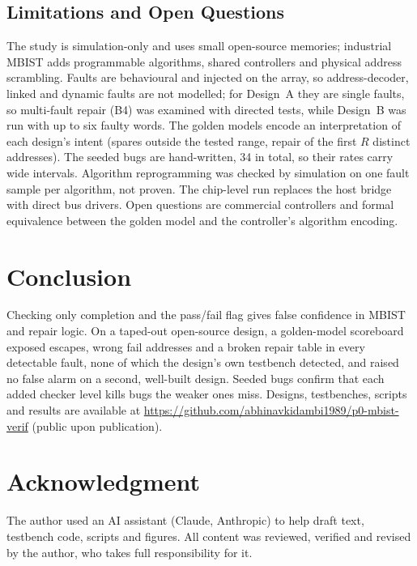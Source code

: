 \documentclass[conference]{IEEEtran}
\begin{document}
\subsection{Limitations and Open Questions}
The study is simulation-only and uses small open-source memories; industrial MBIST adds
programmable algorithms, shared controllers and physical address scrambling. Faults are
behavioural and injected on the array, so address-decoder, linked and dynamic faults are not
modelled; for Design~A they are single faults, so multi-fault repair (B4) was examined with
directed tests, while Design~B was run with up to six faulty words. The golden models encode an
interpretation of each design's intent (spares outside the tested range, repair of the first $R$
distinct addresses). The seeded bugs are hand-written, 34 in total, so their rates carry wide
intervals. Algorithm reprogramming was checked by simulation on one fault sample per
algorithm, not proven. The chip-level run replaces the host bridge with direct bus drivers.
Open questions are commercial controllers and formal equivalence between the golden model and the controller's algorithm encoding.

\section{Conclusion}
Checking only completion and the pass/fail flag gives false confidence in MBIST and repair logic.
On a taped-out open-source design, a golden-model scoreboard exposed escapes, wrong fail addresses
and a broken repair table in every detectable fault, none of which the design's own testbench
detected, and raised no false alarm on a second, well-built design. Seeded bugs confirm that each
added checker level kills bugs the weaker ones miss. Designs, testbenches, scripts and results are
available at \url{https://github.com/abhinavkidambi1989/p0-mbist-verif} (public upon publication).

\section*{Acknowledgment}
The author used an AI assistant (Claude, Anthropic) to help draft text, testbench code, scripts
and figures. All content was reviewed, verified and revised by the author, who takes full
responsibility for it.
\end{document}
